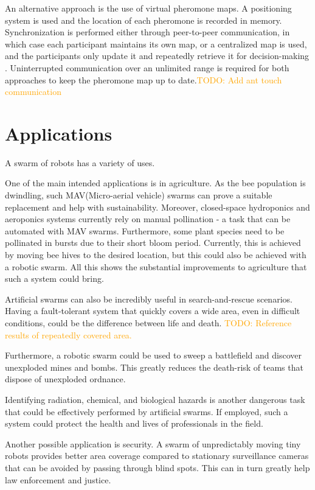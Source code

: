 \documentclass[a4paper, 12pt, twocolumn, times]{article}
\newcommand{\todo}[1]{\textcolor{orange}{TODO: #1}}
\begin{document}
\par An alternative approach is the use of virtual pheromone maps. A positioning system is used and the location of each pheromone is recorded in memory. Synchronization is performed either through peer-to-peer communication, in which case each participant maintains its own map, or a centralized map is used, and the participants only update it and repeatedly retrieve it for decision-making \parencite{winkelstrater_virtual_2019}. Uninterrupted communication over an unlimited range is required for both approaches to keep the pheromone map up to date.\todo{Add ant touch communication}
\section{Applications}
A swarm of robots has a variety of uses.
\par One of the main intended applications is in agriculture. As the bee population is dwindling, such MAV(Micro-aerial vehicle) swarms can prove a suitable replacement and help with sustainability. Moreover, closed-space hydroponics and aeroponics systems currently rely on manual pollination - a task that can be automated with MAV swarms. Furthermore, some plant species need to be pollinated in bursts due to their short bloom period. Currently, this is achieved by moving bee hives to the desired location, but this could also be achieved with a robotic swarm. All this shows the substantial improvements to agriculture that such a system could bring.
\par Artificial swarms can also be incredibly useful in search-and-rescue scenarios. Having a fault-tolerant system that quickly covers a wide area, even in difficult conditions, could be the difference between life and death. \todo{Reference results of repeatedly covered area.}  
\par Furthermore, a robotic swarm could be used to sweep a battlefield and discover unexploded mines and bombs. This greatly reduces the death-risk of teams that dispose of unexploded ordnance.
\par Identifying radiation, chemical, and biological hazards is another dangerous task that could be effectively performed by artificial swarms. If employed, such a system could protect the health and lives of professionals in the field. 
\par Another possible application is security. A swarm of unpredictably moving tiny robots provides better area coverage compared to stationary surveillance cameras that can be avoided by passing through blind spots. This can in turn greatly help law enforcement and justice. 
\end{document}
